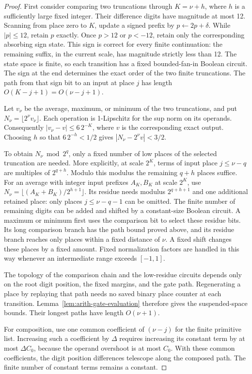 \begin{proof}
First consider comparing two truncations through $K=\nu+h$, where $h$
is a sufficiently large fixed integer.  Their difference digits have
magnitude at most 12.  Scanning from place zero to $K$, update a signed
prefix by $p\leftarrow2p+\delta$.  While $|p|\leq12$, retain $p$
exactly.  Once $p>12$ or $p<-12$, retain only the corresponding
absorbing sign state.  This sign is correct for every finite
continuation: the remaining suffix, in the current scale, has
magnitude strictly less than 12.  The state space is finite, so each
transition has a fixed bounded-fan-in Boolean circuit.  The sign
at the end determines the exact order of the two finite truncations.
The path from that sign bit to an input at place $j$ has length
$O(K-j+1)=O(\nu-j+1)$.

Let $v_\nu$ be the average, maximum, or minimum of the two
truncations, and put $N_\nu=\lfloor2^\nu v_\nu\rfloor$.  Each operation is
1-Lipschitz for the sup norm on its operands.  Consequently
$|v_\nu-v|\leq6\,2^{-K}$, where $v$ is the corresponding exact output.
Choosing $h$ so that $6\,2^{-h}<1/2$ gives
$|N_\nu-2^\nu v|<3/2$.

To obtain $N_\nu\bmod2^q$, only a fixed number of low places of the
selected truncation are needed.  More explicitly, at scale $2^K$,
terms of input place $j\leq \nu-q$ are multiples of $2^{q+h}$.
Modulo this modulus the remaining $q+h$ places suffice.  For an
average with integer input prefixes $A_K,B_K$ at scale $2^K$,
use $N_\nu=\lfloor(A_K+B_K)/2^{h+1}\rfloor$.  Its residue needs
modulus $2^{q+h+1}$ and one additional retained place:
only places $j\leq \nu-q-1$ can be omitted.  The finite number
of remaining digits can be added and shifted by a constant-size
Boolean circuit.  A maximum or minimum first uses the comparison
bit to select these residue bits.  Its long comparison branch has
the path bound proved above, and its residue branch reaches only
places within a fixed distance of $\nu$.  A fixed shift changes these
places by a fixed amount.  Fixed normalization factors are handled
in this way whenever an intermediate range exceeds $[-1,1]$.

The topology of the comparison chain and the low-residue circuits
depends only on the root digit position, the fixed margins, and the gate
path.  Regenerating a place by replaying that path needs no saved
binary place counter at each transition.  Lemma~\ref{lem:arith-gate-evaluation}
therefore gives the suspended-space bounds.  Their longest paths
have length $O(\nu+1)$.

For composition, use one common coefficient of $(\nu-j)$ for the
finite primitive list.  Increasing such a coefficient by $\Delta$
requires increasing its constant term by at most $\Delta C_0$,
because the operand overshoot is at most $C_0$.  With these common
coefficients, the digit position differences telescope along the composed
path.  The finite number of constant terms remains a constant.
\end{proof}

